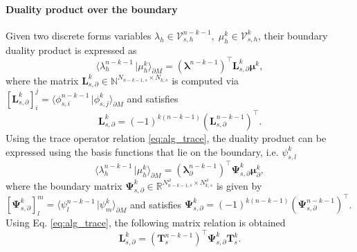 \documentclass{elsarticle}
\newcommand{\dualpr}[3][]{\ensuremath{\langle #2 \, \vert #3 \rangle_{#1}}}
\begin{document}
\paragraph{Duality product over the boundary}
Given two discrete forms variables $\lambda_h \in \mathcal{V}_{s, h}^{n-k-1}, \; \mu_h^k \in \mathcal{V}_{s, h}^{k}$, their boundary duality product is expressed as
\begin{equation}\label{eq:alg_dualpr_bd}
    \dualpr[\partial M]{\lambda_h^{n-k-1}}{\mu_h^k} = (\bm{\lambda}^{n-k-1})^\top \mathbf{L}^k_{s, \partial} \bm{\mu}^k,
\end{equation}
where the matrix $\mathbf{L}^k_{s, \partial} \in \mathbb{N}^{N_{n-k-1, s}\times N_{k, s}}$ is computed via $[\mathbf{L}^k_{s, \partial}]_{i}^j = \dualpr[\partial M]{\phi_{s, i}^{n-k-1}}{\phi_{s, j}^k}$ and satisfies
\begin{equation}
    \mathbf{L}^k_{s, \partial} = (-1)^{k(n-k-1)} (\mathbf{L}^{n-k-1}_{s, \partial})^\top.
\end{equation}
Using the trace operator relation \eqref{eq:alg_trace}, the duality product can be expressed using the basis functions that lie on the boundary, i.e. $\psi_{s, l}^k$
\begin{equation}
\label{eq:alg_wedge_bd}
    \dualpr[\partial M]{\lambda_h^{n-k-1}}{\mu_h^k} = (\bm{\lambda}_\partial^{n-k-1})^\top \mathbf{\Psi}^k_{s, \partial} \bm{\mu}^k_\partial,
\end{equation}
where the boundary matrix $\mathbf{\Psi}^k_{s, \partial} \in \mathbb{R}^{N_{n-k-1, s}^\partial \times N_{k, s}^\partial}$ is given by $[\mathbf{\Psi}^k_{s, \partial}]_{l}^m = \dualpr[\partial M]{\psi^{n-k-1}_l}{\psi^k_m}$ and satisfies $\mathbf{\Psi}^k_{s, \partial} = (-1)^{k(n-k-1)}(\mathbf{\Psi}^{n-k-1}_{s, \partial})^\top$. Using Eq. \eqref{eq:alg_trace}, the following matrix relation is obtained
\begin{equation}
    \mathbf{L}^k_{s, \partial} = (\mathbf{T}^{n-k-1}_s)^\top \mathbf{\Psi}^k_{s, \partial} \mathbf{T}^k_s.
\end{equation}
\end{document}
